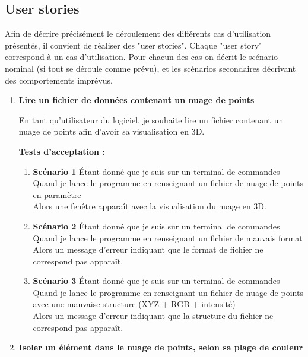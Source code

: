 \documentclass[12pt,titlepage,french]{article}
\begin{document}
\break
\subsection*{User stories}

Afin de décrire précisément le déroulement des différents cas d'utilisation présentés, il convient de réaliser des "user stories".
Chaque "user story" correspond à un cas d'utilisation.
Pour chacun des cas on décrit le scénario nominal (si tout se déroule comme prévu), et les scénarios secondaires décrivant des comportements imprévus.
\begin{enumerate}
    \item \textbf{Lire un fichier de données contenant un nuage de points}
    
En tant qu'utilisateur du logiciel, je souhaite lire un fichier contenant un nuage de points afin d'avoir sa visualisation en 3D.

\textbf{Tests d'acceptation :}

\begin{enumerate}
    \item \textbf{Scénario 1}
Étant donné que je suis sur un terminal de commandes\\
Quand je lance le programme en renseignant un fichier de nuage de points en paramètre\\
Alors une fenêtre apparaît avec la visualisation du nuage en 3D.

    \item \textbf{Scénario 2}
Étant donné que je suis sur un terminal de commandes\\
Quand je lance le programme en renseignant un fichier de mauvais format\\
Alors un message d'erreur indiquant que le format de fichier ne correspond pas apparaît.

    \item \textbf{Scénario 3}
Étant donné que je suis sur un terminal de commandes\\
Quand je lance le programme en renseignant un fichier de nuage de points avec une mauvaise structure (XYZ + RGB + intensité)\\
Alors un message d'erreur indiquant que la structure du fichier ne correspond pas apparaît.

\end{enumerate}

    \item \textbf{Isoler un élément dans le nuage de points, selon sa plage de couleur}
    

\end{enumerate}
\end{document}
